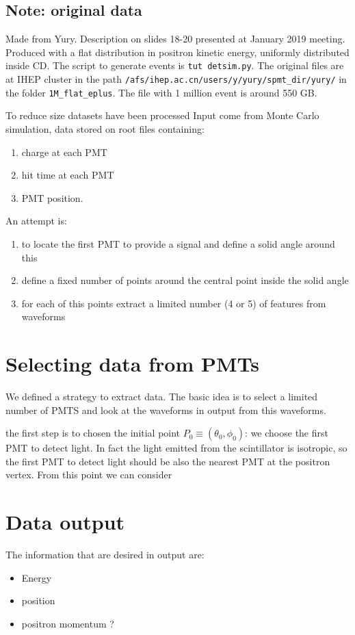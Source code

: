 \documentclass[12pt,a4paper,draft]{article}
\begin{document}
 \subsection{Note: original data}
  Made from Yury. Description on slides 18-20 presented at January 2019 meeting. Produced with a flat distribution in positron kinetic energy, uniformly distributed inside CD. The script to generate events is \texttt{tut detsim.py}. The original files are at IHEP cluster in the path  \texttt{/afs/ihep.ac.cn/users/y/yury/spmt\_dir/yury/} in the folder \texttt{1M\_flat\_eplus}. The file with 1 million event is around 550 GB.\par
  To reduce size datasets have been processed
 Input come from Monte Carlo simulation, data stored on root files containing:
 \begin{enumerate}
 \item charge at each PMT
 \item hit time at each PMT
 \item PMT position.
 \end{enumerate}
 An attempt is:
 \begin{enumerate}
 \item to locate the first PMT to provide a signal and define a solid angle around this
 \item define a fixed number of points around the central point inside the solid angle
 \item for each of this points extract a limited number (4 or 5) of features from waveforms
 \end{enumerate}
\section{Selecting data from PMTs}
We defined a strategy to extract data. The basic idea is to select a limited number of PMTS and look at the waveforms in output from this waveforms.\par
the first step is to chosen the initial point $P_0 \equiv \left( \theta_0 , \phi_0 \right)$: we choose the first PMT to detect light. In fact the light emitted from the scintillator is isotropic, so the first PMT to detect light should be also the nearest PMT at the positron vertex.
From this point we can consider 
\section{Data output}
 The information that are desired in output are:
 \begin{itemize}
 \item Energy
 \item position
 \item positron momentum ?
 \end{itemize}

\end{document}
